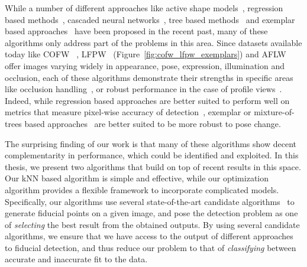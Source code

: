 While a number of different approaches like active shape models~\cite{milborrowCVPR08_ASM},
regression based methods~\cite{yuECCV14_CoR}, cascaded neural
networks~\cite{zhangECCV14_deepfacealign}, tree based methods~\cite{xhuCVPR12_wild} 
and exemplar based approaches~\cite{kumarPAMI13_faceExem}
have been proposed in the recent past, many of these algorithms only
address part of the problems in this area. Since datasets available today like
COFW~\cite{artizzzuICCV13_COFW} ,
LFPW~\cite{kumarPAMI13_faceExem} (Figure~\ref{fig:cofw_lfpw_exemplars}) and AFLW~\cite{koetsingerBFIAT11_AFLW} %
offer images varying widely in appearance, pose, expression, illumination and occlusion,
each of these algorithms demonstrate their strengths in specific areas like
occlusion handling~\cite{artizzzuICCV13_COFW}, or robust performance in the
case of profile views~\cite{xhuCVPR12_wild}. Indeed, while regression based approaches are 
better suited to perform well on metrics that measure pixel-wise accuracy
of detection~\cite{milborrowCVPR08_ASM, yuECCV14_CoR}, exemplar or mixture-of-trees based
approaches~\cite{kumarPAMI13_faceExem, xhuCVPR12_wild} are better suited to be
more robust to pose change.


The surprising finding of our work is that many of these algorithms show
decent complementarity in performance, which could be identified and exploited.
In this thesis, we present two algorithms that build on top of recent results in this space. 
Our kNN based algorithm is simple and effective, while our optimization algorithm provides a 
flexible framework to incorporate complicated models. Specifically, our 
algorithms use several state-of-the-art candidate algorithms~\cite{xhuCVPR12_wild, xiongCVPR13_SDM,
artizzzuICCV13_COFW, asthanaCVPR14_Chehra, Tzimiropoulos_2015_CVPR} to generate
fiducial points on a given image, and pose the detection problem as one
of \emph{selecting} the best result from the obtained outputs. By using several
candidate algorithms, we ensure that we have access to the output of different approaches
to fiducial detection, and thus reduce our problem to that of \emph{classifying} 
between accurate and inaccurate fit to the data.

